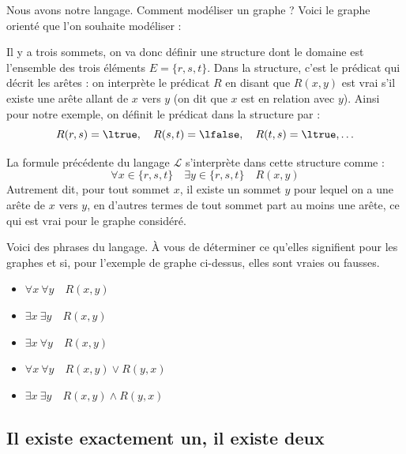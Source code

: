 \documentclass[11pt,class=report,crop=false]{standalone}
\begin{document}
Nous avons notre langage. Comment modéliser un graphe ?
Voici le graphe orienté que l'on souhaite modéliser :




Il y a trois sommets, on va donc définir une structure dont le domaine est l'ensemble des trois éléments $E = \{r, s, t\}$.
Dans la structure, c'est le prédicat qui décrit les arêtes :
on interprète le prédicat $R$ en disant que $R(x,y)$ est vrai s'il existe une arête allant de $x$ vers $y$ (on dit que $x$ est en relation avec $y$).
Ainsi pour notre exemple, on définit le prédicat dans la structure par :
\[
R(r,s) = \ltrue, \quad R(s,t) = \lfalse,\quad R(t,s) = \ltrue, \ldots
\]

La formule précédente du langage $\mathcal{L}$ s'interprète dans cette structure comme :
\[
\forall x \in \{r,s,t\} \quad \exists y \in \{r,s,t\} \quad R(x,y)
\]
Autrement dit, \og{}pour tout sommet $x$, il existe un sommet $y$ pour lequel on a une arête de $x$ vers $y$\fg{}, en d'autres termes \og{}de tout sommet part au moins une arête\fg{}, ce qui est vrai pour le graphe considéré.

Voici des phrases du langage. À vous de déterminer ce qu'elles signifient pour les graphes et si, pour l'exemple de graphe ci-dessus, elles sont vraies ou fausses.
\begin{itemize}
	\item $\forall x \ \forall y \quad R(x,y)$
	
	\item $\exists x \ \exists y \quad R(x,y)$
	
	\item $\exists x \ \forall y \quad R(x,y)$
	
	\item $\forall x \ \forall y \quad R(x,y) \lor R(y,x)$	
	
	\item $\exists x \ \exists y \quad R(x,y) \land R(y,x)$		
\end{itemize}


\subsection{Il existe exactement un, il existe deux}
\end{document}
